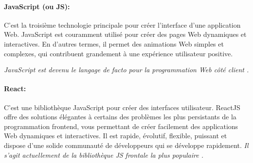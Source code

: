         \paragraph{JavaScript (ou JS): }
         C'est la troisième technologie principale pour créer 
        l'interface d'une application Web. JavaScript est couramment utilisé pour créer des 
        pages Web dynamiques et interactives. En d'autres termes, il permet des animations 
        Web simples et complexes, qui contribuent grandement à une expérience utilisateur 
        positive.
        \par
        \textit{JavaScript est devenu le langage de facto pour la programmation Web côté client \cite{gardner2012towards}.}
        \paragraph{React: }
        C'est une bibliothèque JavaScript pour créer des interfaces utilisateur.
        ReactJS offre des solutions élégantes à certains des problèmes les plus 
        persistants de la programmation frontend, vous permettant de créer facilement 
        des applications Web dynamiques et interactives. Il est rapide, évolutif, flexible, 
        puissant et dispose d’une solide communauté de développeurs qui se développe 
        rapidement. \textit{Il s'agit actuellement de la bibliothèque JS frontale la plus populaire \cite{aggarwal2018modern}.}  
        \par    
